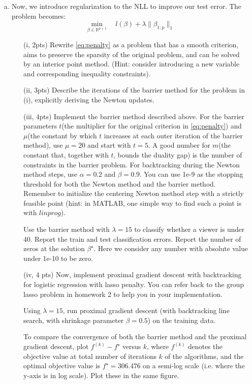 \documentclass{article}
\theoremstyle{remark}
\theoremstyle{definition}
\begin{document}
\begin{enumerate}[(a)]
    \item Now, we introduce regularization to the NLL to improve our test error. The problem becomes:
    \begin{equation}
		\min_{\beta \in \mathbb{R}^{p+1}} \quad l(\beta) + \lambda\|\beta_{1:p}\|_1
	\label{eq:penalty}
	\end{equation}
	    \begin{enumerate}
	    \item[(i, 2pts)] Rewrite \eqref{eq:penalty} as a problem that has a smooth criterion, aims to preserve the sparsity of the original problem, and can be solved by an interior point method. (Hint: consider introducing a new variable and corresponding inequality constraints).
	    \item[(ii, 3pts)] Describe the iterations of the barrier method for the problem in (i), explicitly deriving the Newton updates.
	    \item[(iii, 4pts)] Implement the barrier method described above. For the barrier parameters $t$(the multiplier for the original criterion in \eqref{eq:penalty}) and $\mu$(the constant by which $t$ increases at each outer iteration of the barrier method), use $\mu=20$ and start with $t=5$. A good number for $m$(the constant that, together with $t$, bounds the duality gap) is the number of constraints in the barrier problem. For backtracking during the Newton method steps, use $\alpha=0.2$ and $\beta=0.9$. You can use 1e-9 as the stopping threshold for both the Newton method and the barrier method. Remember to initialize the centering Newton method step with a strictly feasible point (hint: in MATLAB, one simple way to find such a point is with $linprog$).
    
	    Use the barrier method with $\lambda=15$ to classify whether a viewer is under $40$. Report the train and test classification errors. Report the number of zeros at the solution $\beta^{\star}$. Here we consider any number with absolute value under 1e-10 to be zero.
	    
	    \item[(iv, 4 pts)] Now, implement proximal gradient descent with backtracking for logistic regression with lasso penalty. You can refer back to the group lasso problem in homework 2 to help you in your implementation.

      Using $\lambda=15$, run proximal gradient descent (with backtracking line search, with shrinkage parameter $\beta=0.5$) on the training data.
	    
	    To compare the convergence of both the barrier method and the proximal gradient descent, plot $f^{(k)} - f^{\star}$ versus $k$,  where $f^{(k)}$ denotes the objective value at total number of iterations $k$ of the algorithms, and the optimal objective value is $f^\star = 306.476$ on a semi-log scale (i.e. where the y-axis is in log scale). Plot these in the same figure. 


\end{enumerate}
\end{enumerate}
\end{document}
